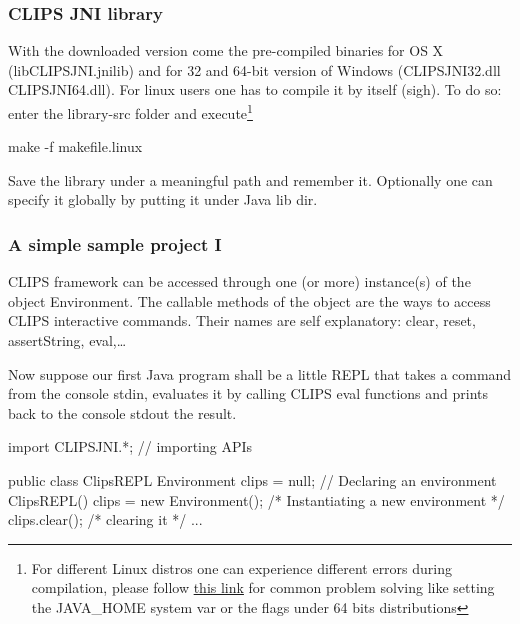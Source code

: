 \documentclass[xcolor={usenames,dvipsnames,svgnames}, compress]{beamer}
\begin{document}
\begin{frame}[fragile]
  \frametitle{CLIPS JNI library}
  With the downloaded version come the pre-compiled binaries for OS X
  (\textsf{libCLIPSJNI.jnilib}) and for 32 and 64-bit version of
  Windows (\textsf{CLIPSJNI32.dll} \textsf{CLIPSJNI64.dll}). For
  linux users one has to compile it by itself (sigh). To do so: enter
  the \textsf{library-src} folder and execute\footnote{
     For different
     Linux distros one can experience different errors during compilation,
     please follow
     \href{https://pimpmylinux.wordpress.com/2011/05/24/compilare-clipsjni-su-linux-32-e-64-bit/}{this
       link}
     for common problem solving like setting
    the \textsf{JAVA\_HOME} system var or the flags under  64 bits distributions
  }
  \begin{clips-code}
    make -f makefile.linux
  \end{clips-code}\par\bigskip
  Save the library under a meaningful path and remember it. Optionally
  one can specify it globally by putting it under Java lib dir.
  
\end{frame}

\begin{frame}[fragile]
  \frametitle{A simple sample project I}
  CLIPS framework can be accessed through one (or more) instance(s) of
  the object \textsf{Environment}. The callable methods of the object
  are the ways to access CLIPS interactive commands. Their names are
  self explanatory: \textsf{clear}, \textsf{reset},
  \textsf{assertString}, \textsf{eval},\dots\par

  Now suppose our first Java program shall be a little REPL that takes
  a command from the console stdin, evaluates it by calling CLIPS
  \textsf{eval} functions and prints back to the console stdout the
  result.\par

  
  \begin{java-code}
    import CLIPSJNI.*; // importing APIs

    public class ClipsREPL {
      Environment clips = null; // Declaring an environment
      ClipsREPL() {
        clips = new Environment(); /* Instantiating a new environment */
        clips.clear(); /* clearing it */
      }
      ...
    }
  \end{java-code}
  
\end{frame}
\end{document}
